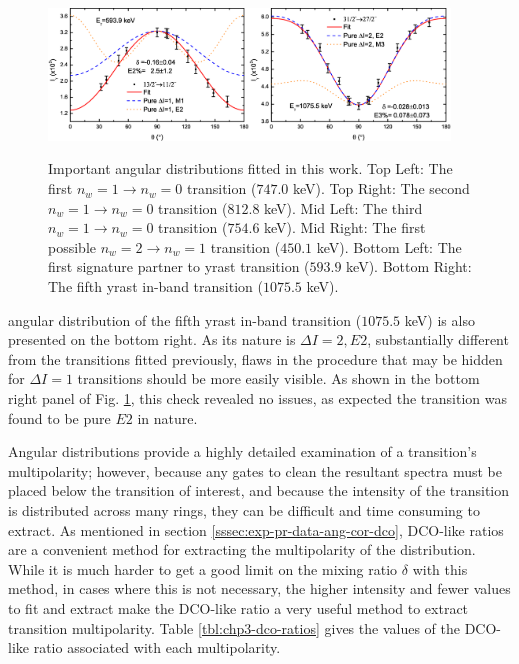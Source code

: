 \begin{figure}[t!]
\centerline{\includegraphics[width=0.475\textwidth]{./img/c4/594Dist_Plot.eps}\hspace{0.04\textwidth}\includegraphics[width=0.475\textwidth]{./img/c4/1075Dist_Plot.eps}}
	\caption{Important angular distributions fitted in this work. Top Left: The first $n_w=1\rightarrow{}n_w=0$ transition ($747.0$ keV). Top Right: The second $n_w=1\rightarrow{}n_w=0$ transition ($812.8$ keV). Mid Left: The third $n_w=1\rightarrow{}n_w=0$ transition ($754.6$ keV). Mid Right: The first possible $n_w=2\rightarrow{}n_w=1$ transition ($450.1$ keV).  Bottom Left: The first signature partner to yrast transition ($593.9$ keV). Bottom Right: The fifth yrast in-band transition ($1075.5$ keV).\label{fig:chp4-angular-distributions}}
\end{figure}
angular distribution of the fifth yrast in-band transition ($1075.5$ keV) is also presented on the bottom right. As its nature is $\Delta{}I=2, E2$, substantially different from the transitions fitted previously, flaws in the procedure that may be hidden for $\Delta{}I=1$ transitions should be more easily visible. As shown in the bottom right panel of Fig. \ref{fig:chp4-angular-distributions}, this check revealed no issues, as expected the transition was found to be pure $E2$ in nature.
 
Angular distributions provide a highly detailed examination of a transition's multipolarity; however, because any gates to clean the resultant spectra must be placed below the transition of interest, and because the intensity of the transition is distributed across many rings, they can be difficult and time consuming to extract. As mentioned in section \ref{sssec:exp-pr-data-ang-cor-dco}, DCO-like ratios are a convenient method for extracting the multipolarity of the distribution. While it is much harder to get a good limit on the mixing ratio $\delta$ with this method, in cases where this is not necessary, the higher intensity and fewer values to fit and extract make the DCO-like ratio a very useful method to extract transition multipolarity. Table \ref{tbl:chp3-dco-ratios} gives the values of the DCO-like ratio associated with each multipolarity. 

